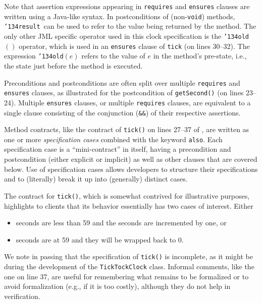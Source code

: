 \documentclass{llncs}
\def\old{\texttt{\char'134old}}
\def\result{\texttt{\char'134result}}
\begin{document}
Note that assertion expressions appearing in \texttt{requires} and
\texttt{ensures} clauses are written using a Java-like syntax.
%
\GMARGIN{\old}
\GMARGIN{\result}
%
In postconditions of (non-\texttt{void}) methods, \result\ can be used to refer to the 
value being returned by the method.
The only other JML specific operator used in this clock specification is the
\old$()$ operator, which is used in an \texttt{ensures} clause of
\texttt{tick} (on lines 30--32).  The 
expression \old$(e)$ refers to the value of $e$ in the method's pre-state,
i.e., the state just before the method is executed.

Preconditions and postconditions are often split over multiple \texttt{requires}
and \texttt{ensures} clauses, as illustrated for the postcondition of 
\texttt{getSecond()} (on lines 23--24).  Multiple \texttt{ensures}
clauses, or multiple \texttt{requires} clauses, are equivalent to
a single clause consisting of the conjunction (\texttt{\&\&}) of their
respective assertions.

Method contracts, like the contract of \texttt{tick()} on lines 27--37
of , are written as one or
more \emph{specification cases} combined with the keyword \texttt{also}.
Each specification case is a ``mini-contract'' in itself, having a precondition
and postcondition (either explicit or implicit) as well as other clauses
that are covered below.
Use of specification cases allows developers to structure their
specifications and to (literally) break it up into (generally) distinct cases.

The contract for \texttt{tick()},
which is somewhat contrived for illustrative purposes,
highlights to clients that its behavior 
essentially has two cases of interest.  Either 
\begin{itemize}
  \item seconds are less than 59 and the seconds are incremented by one,
    or
  \item seconds are at 59 and they will be wrapped back to 0.
\end{itemize}
%
We note in passing that the specification of \texttt{tick()} is incomplete, as
it might be during the development of the \texttt{TickTockClock} class.
Informal comments, like the one on line 37, are useful for
remembering what remains to be formalized or to avoid formalization
(e.g., if it is too costly), although they do not help in verification. 
\end{document}

